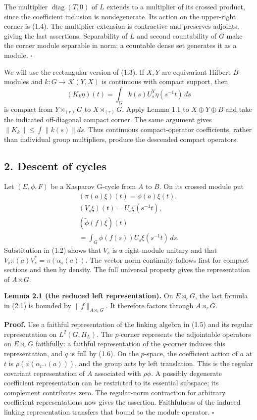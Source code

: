 \documentclass[
  11pt,
]{article}
\begin{document}
The multiplier \(\operatorname{diag}(T,0)\) of \(L\) extends to a
multiplier of its crossed product, since the coefficient inclusion is
nondegenerate. Its action on the upper-right corner is (1.4). The
multiplier extension is contractive and preserves adjoints, giving the
last assertions. Separability of \(L\) and second countability of \(G\)
make the corner module separable in norm; a countable dense set
generates it as a module. \(\square\)

We will use the rectangular version of (1.3). If \(X,Y\) are equivariant
Hilbert \(B\)-modules and \(k:G\to\mathcal K(Y,X)\) is continuous with
compact support, then \[
(K_k\eta)(t)=\int_G k(s)U_s^Y\eta(s^{-1}t)\,ds
\tag{1.7}
\] is compact from \(Y\rtimes_{(r)}G\) to \(X\rtimes_{(r)}G\). Apply
Lemma 1.1 to \(X\oplus Y\oplus B\) and take the indicated off-diagonal
compact corner. The same argument gives \(\|K_k\|\leq\int\|k(s)\|ds\).
Thus continuous compact-operator coefficients, rather than individual
group multipliers, produce the descended compact operators.

\subsection{2. Descent of cycles}\label{descent-of-cycles}

Let \((E,\phi,F)\) be a Kasparov G-cycle from \(A\) to \(B\). On its
crossed module put \[
\begin{gathered}
(\pi(a)\xi)(t)=\phi(a)\xi(t),\\
(V_s\xi)(t)=U_s\xi(s^{-1}t),\\
(\widetilde\phi(f)\xi)(t)\\
=\int_G\phi(f(s))U_s\xi(s^{-1}t)\,ds.
\end{gathered}
\tag{2.1}
\] Substitution in (1.2) shows that \(V_s\) is a right-module unitary
and that \(V_s\pi(a)V_s^*=\pi(\alpha_s(a))\). The vector norm continuity
follows first for compact sections and then by density. The full
universal property gives the representation of \(A\rtimes G\).

\textbf{Lemma 2.1 (the reduced left representation).} On
\(E\rtimes_rG\), the last formula in (2.1) is bounded by
\(\|f\|_{A\rtimes_rG}\). It therefore factors through \(A\rtimes_rG\).

\textbf{Proof.} Use a faithful representation of the linking algebra in
(1.5) and its regular representation on \(L^2(G,H_L)\). The \(p\)-corner
represents the adjointable operators on \(E\rtimes_rG\) faithfully: a
faithful representation of the \(q\)-corner induces this representation,
and \(q\) is full by (1.6). On the \(p\)-space, the coefficient action
of \(a\) at \(t\) is \(\rho(\phi(\alpha_{t^{-1}}(a)))\), and the group
acts by left translation. This is the regular covariant representation
of \(A\) associated with \(\rho\phi\). A possibly degenerate coefficient
representation can be restricted to its essential subspace; its
complement contributes zero. The regular-norm contraction for arbitrary
coefficient representations now gives the assertion. Faithfulness of the
induced linking representation transfers that bound to the module
operator. \(\square\)
\end{document}
